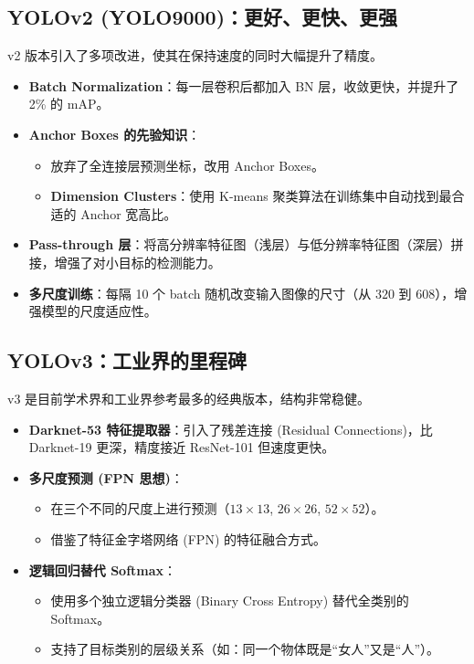 \documentclass[11pt,a4paper]{article}
\begin{document}
\subsection{YOLOv2 (YOLO9000)：更好、更快、更强}
v2 版本引入了多项改进，使其在保持速度的同时大幅提升了精度。
\begin{itemize}
    \item \textbf{Batch Normalization}：每一层卷积后都加入 BN 层，收敛更快，并提升了 2\% 的 mAP。
    \item \textbf{Anchor Boxes 的先验知识}：
    \begin{itemize}
        \item 放弃了全连接层预测坐标，改用 Anchor Boxes。
        \item \textbf{Dimension Clusters}：使用 K-means 聚类算法在训练集中自动找到最合适的 Anchor 宽高比。
    \end{itemize}
    \item \textbf{Pass-through 层}：将高分辨率特征图（浅层）与低分辨率特征图（深层）拼接，增强了对小目标的检测能力。
    \item \textbf{多尺度训练}：每隔 10 个 batch 随机改变输入图像的尺寸（从 $320$ 到 $608$），增强模型的尺度适应性。
\end{itemize}

\subsection{YOLOv3：工业界的里程碑}
v3 是目前学术界和工业界参考最多的经典版本，结构非常稳健。
\begin{itemize}
    \item \textbf{Darknet-53 特征提取器}：引入了残差连接 (Residual Connections)，比 Darknet-19 更深，精度接近 ResNet-101 但速度更快。
    \item \textbf{多尺度预测 (FPN 思想)}：
    \begin{itemize}
        \item 在三个不同的尺度上进行预测（$13 \times 13$, $26 \times 26$, $52 \times 52$）。
        \item 借鉴了特征金字塔网络 (FPN) 的特征融合方式。
    \end{itemize}
    \item \textbf{逻辑回归替代 Softmax}：
    \begin{itemize}
        \item 使用多个独立逻辑分类器 (Binary Cross Entropy) 替代全类别的 Softmax。
        \item 支持了目标类别的层级关系（如：同一个物体既是“女人”又是“人”）。
    \end{itemize}
\end{itemize}
\end{document}
